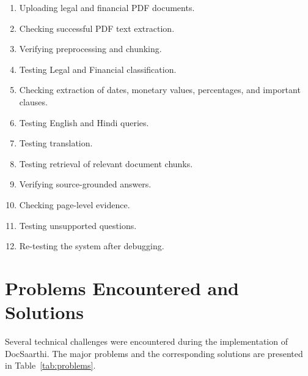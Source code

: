 \begin{enumerate}

    \item Uploading legal and financial PDF documents.

    \item Checking successful PDF text extraction.

    \item Verifying preprocessing and chunking.

    \item Testing Legal and Financial classification.

    \item Checking extraction of dates, monetary values, percentages,
    and important clauses.

    \item Testing English and Hindi queries.

    \item Testing translation.

    \item Testing retrieval of relevant document chunks.

    \item Verifying source-grounded answers.

    \item Checking page-level evidence.

    \item Testing unsupported questions.

    \item Re-testing the system after debugging.

\end{enumerate}

\section{Problems Encountered and Solutions}

Several technical challenges were encountered during the
implementation of DocSaarthi. The major problems and the
corresponding solutions are presented in Table~\ref{tab:problems}.

